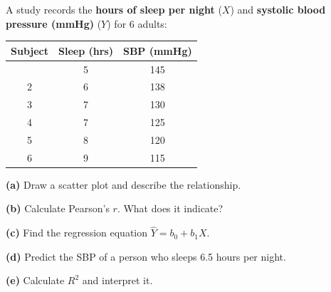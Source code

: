 \documentclass[
  12pt,
  letterpaper,
]{book}
\newcounter{none} %
\begin{document}
\begin{tcolorbox}[enhanced jigsaw, arc=.35mm, bottomrule=.15mm, bottomtitle=1mm, breakable, colback=white, colbacktitle=quarto-callout-caution-color!10!white, colframe=quarto-callout-caution-color-frame, coltitle=black, left=2mm, leftrule=.75mm, opacityback=0, opacitybacktitle=0.6, rightrule=.15mm, title={✏️ Exercise 1}, titlerule=0mm, toprule=.15mm, toptitle=1mm]

A study records the \textbf{hours of sleep per night} (\(X\)) and
\textbf{systolic blood pressure (mmHg)} (\(Y\)) for 6 adults:

{\def\LTcaptype{none} %
\begin{longtable}[]{@{}ccc@{}}
\toprule\noalign{}
Subject & Sleep (hrs) & SBP (mmHg) \\
\midrule\noalign{}
\endhead
\bottomrule\noalign{}
\endlastfoot
1 & 5 & 145 \\
2 & 6 & 138 \\
3 & 7 & 130 \\
4 & 7 & 125 \\
5 & 8 & 120 \\
6 & 9 & 115 \\
\end{longtable}
}

\textbf{(a)} Draw a scatter plot and describe the relationship.

\textbf{(b)} Calculate Pearson's \(r\). What does it indicate?

\textbf{(c)} Find the regression equation \(\hat{Y} = b_0 + b_1 X\).

\textbf{(d)} Predict the SBP of a person who sleeps 6.5 hours per night.

\textbf{(e)} Calculate \(R^2\) and interpret it.

\end{tcolorbox}
\end{document}
